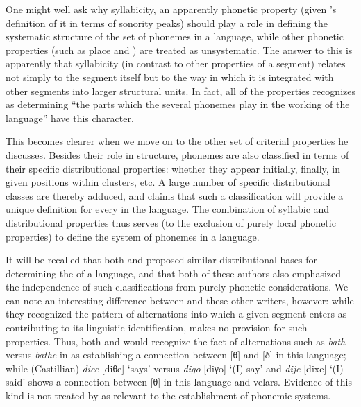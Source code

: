 One might well ask why syllabicity, an apparently phonetic property
(given {\Bloomfield}'s definition of it in terms of sonority peaks)
should play a role in defining the systematic structure of the set of
phonemes in a language, while other phonetic properties (such as place
and ) are treated as unsystematic. The answer to
this is apparently that syllabicity (in {contrast} to other properties
of a segment) relates not simply to the segment itself but to the way
in which it is integrated with other segments into larger structural
units. In fact, all of the properties {\Bloomfield} recognizes as
determining ``the parts which the several phonemes play in the working
of the language'' have this character.

This becomes clearer when we move on to the other set of criterial
properties he discusses. Besides their role in  structure,
phonemes are also classified in terms of their specific distributional
properties: whether they appear initially, finally, in given positions
within clusters, etc. A large number of specific distributional
classes are thereby adduced, and {\Bloomfield} claims that such a
classification will provide a unique definition for every  in
the language. The combination of syllabic and distributional
properties thus serves (to the exclusion of purely local phonetic
properties) to define the system of phonemes in a language.

It will be recalled that both {\Hjelmslev} and {\Sapir} proposed similar
distributional bases for determining the  of a
language, and that both of these authors also emphasized the
independence of such classifications from purely phonetic
considerations. We can note an interesting difference between
{\Bloomfield} and these other writers, however: while they recognized the
pattern of alternations into which a given segment enters as
contributing to its linguistic identification, {\Bloomfield} makes no
provision for such properties. Thus, both {\Sapir} and {\Hjelmslev} would
recognize the fact of alternations such as \emph{bath} versus
\emph{bathe} in  as establishing a connection between [θ] and
[ð] in this language; while (Castillian)  \textit{dice} [diθe]
`says' versus \emph{digo} [diγo] `(I) say' and \emph{dije} [dixe] `(I)
said' shows a connection between [θ] in this language and
velars. Evidence of this kind is not treated by {\Bloomfield} as relevant
to the establishment of phonemic systems.


